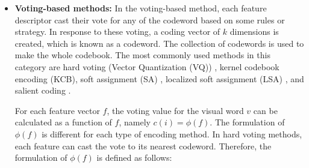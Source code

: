 \begin{itemize}
\item \textbf{Voting-based methods:} 
In the voting-based method, each feature descriptor cast their vote for any of the codeword based on some rules or strategy. In response to these voting, a coding vector of $k$ dimensions is created, which is known as a codeword. The collection of codewords is used to make the whole codebook. The most commonly used methods in this category are hard voting (Vector Quantization (VQ)) \cite{sivic2003}, kernel codebook encoding (KCB), soft assignment (SA) \cite{Gemert2010}, localized soft assignment (LSA) \cite{Liu2011}, and salient coding \cite{Huang2011salient}.

For each feature vector $f$, the voting value  for the visual word $v$ can be calculated as a function of $f$,  namely $c(i)=\phi(f)$. The formulation of $\phi(f)$ is different for each type of encoding method. In hard voting methods, each feature can cast the vote to its nearest codeword. Therefore, the formulation of $\phi(f)$  is defined as follows:


\end{itemize}
